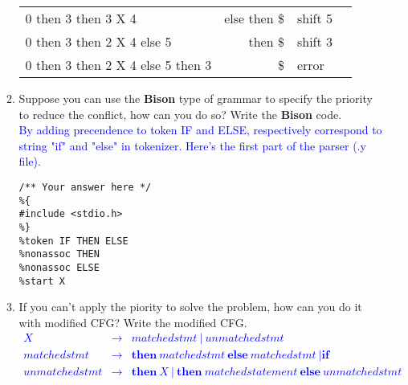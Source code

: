\documentclass[10pt]{exam}
\begin{document}
\begin{enumerate}
\begin{enumerate}
{\begin{tabular}{l r l l}
                    0 then 3 then 3 X 4               & else then \$              & shift 5                     &                   \\
                    0 then 3 then 2 X 4 else 5        & then \$                   & shift 3                     &                   \\
                    0 then 3 then 2 X 4 else 5 then 3 & \$                        & error                       &                   \\
                  \end{tabular}
                }
          \item Suppose you can use the \textbf{Bison} type of grammar to specify the priority to reduce the conflict, how
                can you do so? Write the \textbf{Bison} code.\\
                \textcolor{blue}{
                  By adding precendence to token IF and ELSE, respectively correspond to string "if" and "else" in tokenizer. Here's the first part of the parser (.y file).
                }
                \begin{verbatim}
/** Your answer here */
%{
#include <stdio.h>
%}
%token IF THEN ELSE
%nonassoc THEN
%nonassoc ELSE
%start X
                \end{verbatim}

          \item If you can't apply the piority to solve the problem, how can you do it with modified CFG? Write the modified
                CFG.
                \textcolor{blue}{
                  \[\begin{array}{cll}
                      X             & \rightarrow & matchedstmt\ |\ unmatchedstmt                                                          \\
                      matchedstmt   & \rightarrow & \textbf{then}\ matchedstmt\ \textbf{else}\ matchedstmt\ | \textbf{if}                  \\
                      unmatchedstmt & \rightarrow & \textbf{then}\  X\ |\ \textbf{then}\  matchedstatement\  \textbf{else}\  unmatchedstmt
                    \end{array}\]
                }
        \end{enumerate}
\end{enumerate}
\end{document}
